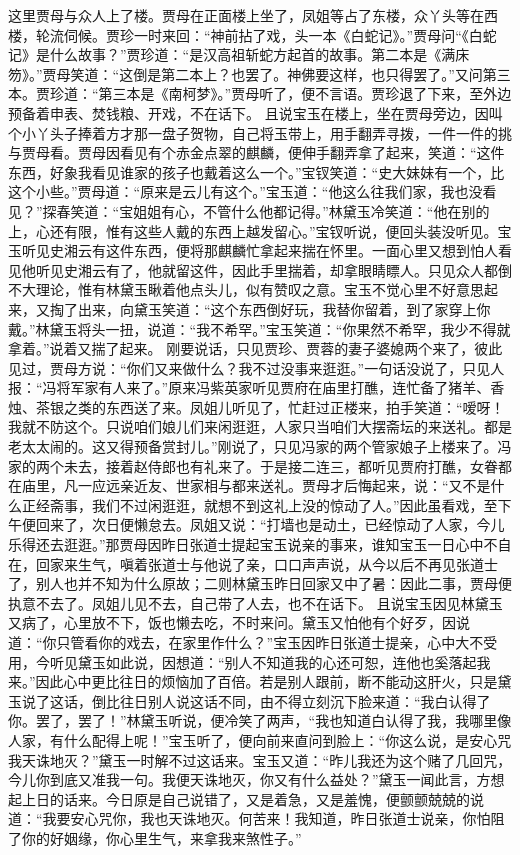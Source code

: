 \documentclass[12pt,oneside]{book}
\begin{document}
这里贾母与众人上了楼。贾母在正面楼上坐了，凤姐等占了东楼，众丫头等在西楼，轮流伺候。贾珍一时来回：“神前拈了戏，头一本《白蛇记》。”贾母问“《白蛇记》是什么故事？”贾珍道：“是汉高祖斩蛇方起首的故事。第二本是《满床笏》。”贾母笑道：“这倒是第二本上？也罢了。神佛要这样，也只得罢了。”又问第三本。贾珍道：“第三本是《南柯梦》。”贾母听了，便不言语。贾珍退了下来，至外边预备着申表、焚钱粮、开戏，不在话下。
且说宝玉在楼上，坐在贾母旁边，因叫个小丫头子捧着方才那一盘子贺物，自己将玉带上，用手翻弄寻拨，一件一件的挑与贾母看。贾母因看见有个赤金点翠的麒麟，便伸手翻弄拿了起来，笑道：“这件东西，好象我看见谁家的孩子也戴着这么一个。”宝钗笑道：“史大妹妹有一个，比这个小些。”贾母道：“原来是云儿有这个。”宝玉道：“他这么往我们家，我也没看见？”探春笑道：“宝姐姐有心，不管什么他都记得。”林黛玉冷笑道：“他在别的上，心还有限，惟有这些人戴的东西上越发留心。”宝钗听说，便回头装没听见。宝玉听见史湘云有这件东西，便将那麒麟忙拿起来揣在怀里。一面心里又想到怕人看见他听见史湘云有了，他就留这件，因此手里揣着，却拿眼睛瞟人。只见众人都倒不大理论，惟有林黛玉瞅着他点头儿，似有赞叹之意。宝玉不觉心里不好意思起来，又掏了出来，向黛玉笑道：“这个东西倒好玩，我替你留着，到了家穿上你戴。”林黛玉将头一扭，说道：“我不希罕。”宝玉笑道：“你果然不希罕，我少不得就拿着。”说着又揣了起来。
刚要说话，只见贾珍、贾蓉的妻子婆媳两个来了，彼此见过，贾母方说：“你们又来做什么？我不过没事来逛逛。”一句话没说了，只见人报：“冯将军家有人来了。”原来冯紫英家听见贾府在庙里打醮，连忙备了猪羊、香烛、茶银之类的东西送了来。凤姐儿听见了，忙赶过正楼来，拍手笑道：“嗳呀！我就不防这个。只说咱们娘儿们来闲逛逛，人家只当咱们大摆斋坛的来送礼。都是老太太闹的。这又得预备赏封儿。”刚说了，只见冯家的两个管家娘子上楼来了。冯家的两个未去，接着赵侍郎也有礼来了。于是接二连三，都听见贾府打醮，女眷都在庙里，凡一应远亲近友、世家相与都来送礼。贾母才后悔起来，说：“又不是什么正经斋事，我们不过闲逛逛，就想不到这礼上没的惊动了人。”因此虽看戏，至下午便回来了，次日便懒怠去。凤姐又说：“打墙也是动土，已经惊动了人家，今儿乐得还去逛逛。”那贾母因昨日张道士提起宝玉说亲的事来，谁知宝玉一日心中不自在，回家来生气，嗔着张道士与他说了亲，口口声声说，从今以后不再见张道士了，别人也并不知为什么原故；二则林黛玉昨日回家又中了暑：因此二事，贾母便执意不去了。凤姐儿见不去，自己带了人去，也不在话下。
且说宝玉因见林黛玉又病了，心里放不下，饭也懒去吃，不时来问。黛玉又怕他有个好歹，因说道：“你只管看你的戏去，在家里作什么？”宝玉因昨日张道士提亲，心中大不受用，今听见黛玉如此说，因想道：“别人不知道我的心还可恕，连他也奚落起我来。”因此心中更比往日的烦恼加了百倍。若是别人跟前，断不能动这肝火，只是黛玉说了这话，倒比往日别人说这话不同，由不得立刻沉下脸来道：“我白认得了你。罢了，罢了！”林黛玉听说，便冷笑了两声，“我也知道白认得了我，我哪里像人家，有什么配得上呢！”宝玉听了，便向前来直问到脸上：“你这么说，是安心咒我天诛地灭？”黛玉一时解不过这话来。宝玉又道：“昨儿我还为这个赌了几回咒，今儿你到底又准我一句。我便天诛地灭，你又有什么益处？”黛玉一闻此言，方想起上日的话来。今日原是自己说错了，又是着急，又是羞愧，便颤颤兢兢的说道：“我要安心咒你，我也天诛地灭。何苦来！我知道，昨日张道士说亲，你怕阻了你的好姻缘，你心里生气，来拿我来煞性子。”
\end{document}
